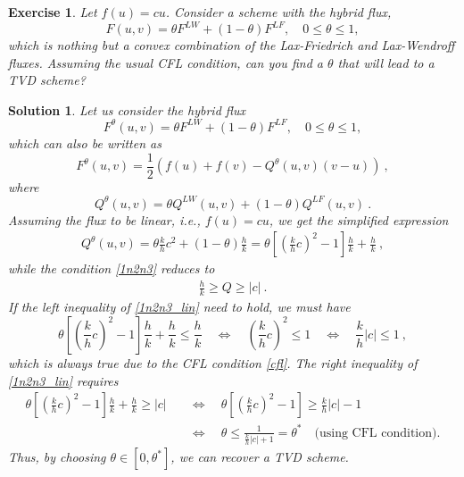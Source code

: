 \documentclass[10pt,letterpaper]{article}
\theoremstyle{break}
\newtheorem{exercise}{Exercise}
\newtheorem{mysolution}{Solution}
\newenvironment{solution}{\begin{mysolution}}{\end{mysolution}}
\begin{document}
\begin{exercise}
        Let $f(u) = c u$. Consider a scheme with the hybrid flux,
        \[
        F(u,v) = \theta F^{LW} + (1-\theta) F^{LF}, \quad 0 \leq \theta \leq 1,
        \]
        which is nothing but a convex combination of the Lax-Friedrich and Lax-Wendroff fluxes.
        Assuming the usual CFL condition, can you find a $\theta$ that will lead to a TVD scheme?
\end{exercise}


\begin{solution}
        Let us consider the hybrid flux 
        \[
        F^\theta(u,v) = \theta F^{LW} + (1-\theta) F^{LF}, \quad 0 \leq \theta \leq 1,
        \]
        which can also be written as
        \[
        F^\theta(u,v) = \frac{1}{2} \left( f(u) + f(v) - Q^\theta(u,v) (v-u)\right) \ , 
        \]
        where
        \[
        Q^\theta(u,v) = \theta Q^{LW}(u,v) + (1-\theta) Q^{LF}(u,v)\ .
        \]
        Assuming the flux to be linear, i.e., $f(u) = cu$, we get the simplified expression
        \begin{gather} \label{hybQ}
        Q^\theta(u,v) = \theta \frac{k}{h} c^2 + (1-\theta) \frac{h}{k} = \theta\left[ \left(\frac{k}{h} c\right)^2 - 1\right]\frac{h}{k} + \frac{h}{k}\ ,
        \end{gather}
        while the condition \eqref{1n2n3} reduces to 
        \begin{gather} \label{1n2n3_lin}
        \frac{h}{k} \geq Q \geq |c|\ .
        \end{gather}
        If the left inequality of \eqref{1n2n3_lin} need to hold, we must have
        \[
        \theta\left[ \left(\frac{k}{h} c\right)^2 - 1\right]\frac{h}{k} + \frac{h}{k} \leq \frac{h}{k} \quad \iff \quad \left(\frac{k}{h} c\right)^2 \leq 1 \quad \iff \quad \frac{k}{h} |c| \leq 1\ ,
        \]
        which is always true due to the CFL condition \eqref{cfl}. The right inequality of \eqref{1n2n3_lin} requires
        \begin{align*}
        \theta\left[ \left(\frac{k}{h} c\right)^2 - 1\right]\frac{h}{k} + \frac{h}{k} \geq |c| &\quad \iff \quad \theta\left[ \left(\frac{k}{h} c\right)^2 - 1\right]\geq \frac{k}{h} |c| -1 \\
        &\quad \iff \quad \theta \leq \frac{1}{\frac{k}{h} |c| + 1} = \theta^* \quad \text{(using CFL condition)}.
        \end{align*}
        Thus, by choosing $\theta \in [0,\theta^*]$, we can recover a TVD scheme.        
\end{solution}




\newpage
\end{document}
